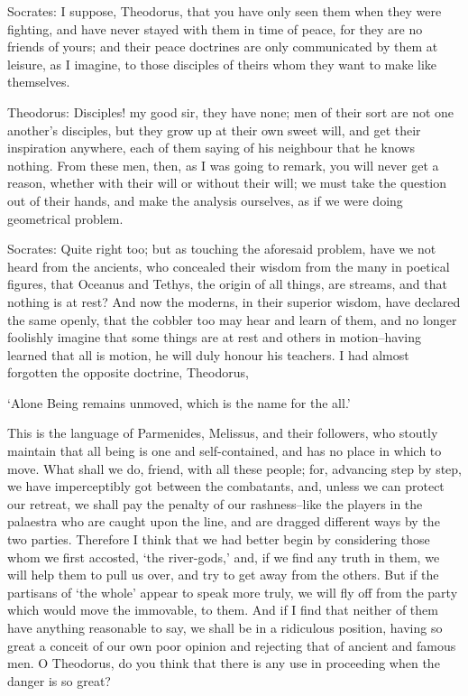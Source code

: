 Socrates: I suppose, Theodorus, that you have only seen them when they
were fighting, and have never stayed with them in time of peace,
for they are no friends of yours; and their peace doctrines are only
communicated by them at leisure, as I imagine, to those disciples of
theirs whom they want to make like themselves.

Theodorus: Disciples! my good sir, they have none; men of their sort are
not one another's disciples, but they grow up at their own sweet will,
and get their inspiration anywhere, each of them saying of his neighbour
that he knows nothing. From these men, then, as I was going to remark,
you will never get a reason, whether with their will or without their
will; we must take the question out of their hands, and make the
analysis ourselves, as if we were doing geometrical problem.

Socrates: Quite right too; but as touching the aforesaid problem, have
we not heard from the ancients, who concealed their wisdom from the many
in poetical figures, that Oceanus and Tethys, the origin of all things,
are streams, and that nothing is at rest? And now the moderns, in their
superior wisdom, have declared the same openly, that the cobbler too may
hear and learn of them, and no longer foolishly imagine that some things
are at rest and others in motion--having learned that all is motion,
he will duly honour his teachers. I had almost forgotten the opposite
doctrine, Theodorus,

     `Alone Being remains unmoved, which is the name for the all.'

This is the language of Parmenides, Melissus, and their followers, who
stoutly maintain that all being is one and self-contained, and has no
place in which to move. What shall we do, friend, with all these people;
for, advancing step by step, we have imperceptibly got between the
combatants, and, unless we can protect our retreat, we shall pay the
penalty of our rashness--like the players in the palaestra who are
caught upon the line, and are dragged different ways by the two parties.
Therefore I think that we had better begin by considering those whom we
first accosted, `the river-gods,' and, if we find any truth in them, we
will help them to pull us over, and try to get away from the others. But
if the partisans of `the whole' appear to speak more truly, we will fly
off from the party which would move the immovable, to them. And if I
find that neither of them have anything reasonable to say, we shall
be in a ridiculous position, having so great a conceit of our own poor
opinion and rejecting that of ancient and famous men. O Theodorus, do
you think that there is any use in proceeding when the danger is so
great?

